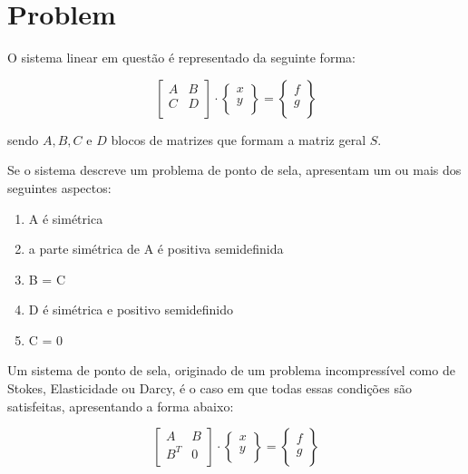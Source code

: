 \documentclass[12pt]{article}
\begin{document}
\section{Problem}

O sistema linear em questão é representado da seguinte forma: 

\begin{equation} \label{eq:system}
    \begin{bmatrix}
        A & B \\
        C & D \\
    \end{bmatrix}
    \cdot
    \begin{Bmatrix}
        x \\
        y \\
    \end{Bmatrix}
    =
    \begin{Bmatrix}
        f \\
        g \\
    \end{Bmatrix}
\end{equation}

sendo \(A, B, C\) e \(D\) blocos de matrizes que formam a matriz geral \(S\).

Se o sistema descreve um problema de ponto de sela, apresentam um ou mais dos seguintes aspectos: 

\begin{enumerate}
  \item A é simétrica
  \item a parte simétrica de A é positiva semidefinida
  \item B = C 
  \item D é simétrica e positivo semidefinido
  \item C = 0 
\end{enumerate}

Um sistema de ponto de sela, originado de um problema incompressível como de Stokes, Elasticidade ou Darcy, é o caso em que todas 
essas condições são satisfeitas, apresentando a forma abaixo:

\begin{equation} \label{eq:system}
    \begin{bmatrix}
        A & B \\
        B^T & 0 \\
    \end{bmatrix}
    \cdot
    \begin{Bmatrix}
        x \\
        y \\
    \end{Bmatrix}
    =
    \begin{Bmatrix}
        f \\
        g \\
    \end{Bmatrix}
\end{equation}
\end{document}
